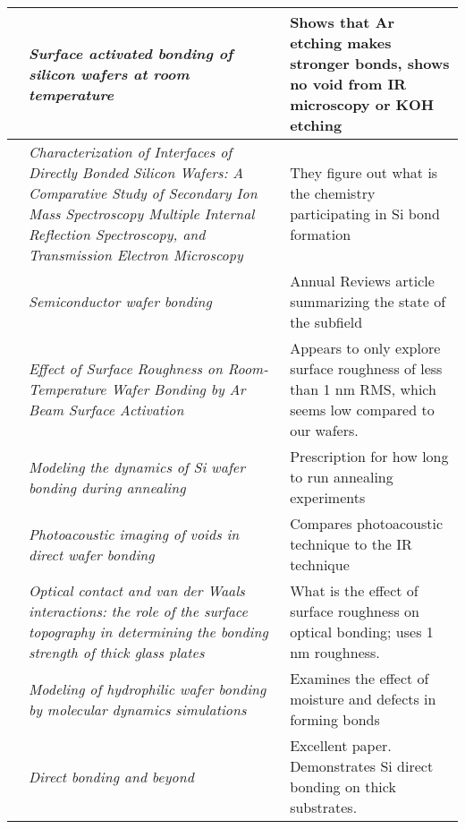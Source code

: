 \documentclass[osajnl,preprint,showpacs,superscriptaddress,12pt]{revtex4-1} %
\begin{document}
\begin{spacing}{1.0}
\begin{center}
\begin{longtable}{ |c | p{8cm} | p{8cm} |}
              \hline
     \cite{1996ApPhL..68.2222T} &  \emph{Surface activated bonding of silicon wafers at room temperature} &  Shows that Ar etching makes stronger bonds, shows no void from IR microscopy or KOH etching  \\     
              \hline
     \cite{1996JaJAP..35.2102R} &  \emph{Characterization of Interfaces of Directly Bonded Silicon Wafers: A Comparative Study of Secondary Ion Mass Spectroscopy Multiple Internal Reflection Spectroscopy, and Transmission Electron Microscopy} &  They figure out what is the chemistry participating in Si bond formation\\               
              \hline
     \cite{1998AnRMS..28..215G} &  \emph{Semiconductor wafer bonding} &  Annual Reviews article summarizing the state of the subfield\\ 
              \hline
     \cite{JJAP.37.4197} &  \emph{Effect of Surface Roughness on Room-Temperature Wafer Bonding by Ar Beam Surface Activation} &  Appears to only explore surface roughness of less than 1 nm RMS, which seems low compared to our wafers.\\ 
              \hline
     \cite{2000JAP....88.4404H} &  \emph{Modeling the dynamics of Si wafer bonding during annealing} &  Prescription for how long to run annealing experiments\\     
              \hline
     \cite{2000RScI...71.1869G} &  \emph{Photoacoustic imaging of voids in direct wafer bonding} &  Compares photoacoustic technique to the IR technique \\     
              \hline
     \cite{2001JOptA...3...85G} &  \emph{Optical contact and van der Waals interactions: the role of the surface topography in determining the bonding strength of thick glass plates} &  What is the effect of surface roughness on optical bonding; uses 1 nm roughness.\\
              \hline
     \cite{2001JAP....89.6013L} &  \emph{Modeling of hydrophilic wafer bonding by molecular dynamics simulations} &  Examines the effect of moisture and defects in forming bonds\\ 
          \cite{2007ApOpt..46.6793H} &  \emph{Direct bonding and beyond} &  Excellent paper.  Demonstrates Si direct bonding on thick substrates.\\ 
    \hline
\end{longtable}
\end{center}
\end{spacing} 
\end{document}
